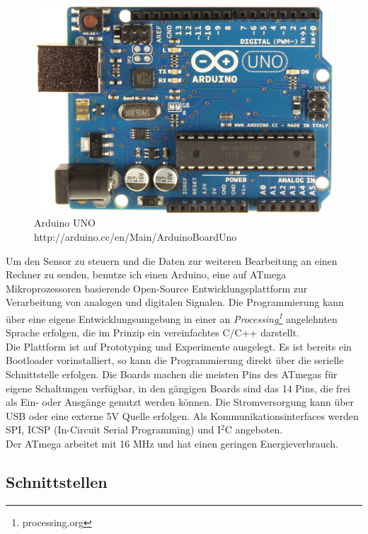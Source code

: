 \documentclass[12pt,a4paper,twoside,BCOR=12.5mm]{scrartcl}
\begin{document}
\begin{figure}[ht]
\centering
\includegraphics[scale=.2]{hardwareimages/ArduinoUno_R3_Front.jpg}
\caption{Arduino UNO \\ http://arduino.cc/en/Main/ArduinoBoardUno}
\label{Arduino}
\end{figure}


Um den Sensor zu steuern und die Daten zur weiteren Bearbeitung an einen Rechner zu senden, benutze ich einen Arduino, eine auf ATmega Mikroprozessoren basierende Open-Source Entwicklungsplattform zur Verarbeitung von analogen und digitalen Signalen. Die Programmierung kann über eine eigene Entwicklungsumgebung in einer an \textit{Processing\footnote{processing.org}} angelehnten Sprache erfolgen, die im Prinzip ein vereinfachtes C/C++ darstellt.\\
Die Plattform ist auf Prototyping und Experimente ausgelegt. Es ist bereits ein Bootloader vorinstalliert, so kann die Programmierung direkt über die serielle Schnittstelle erfolgen. Die Boards machen die meisten Pins des ATmegas für eigene Schaltungen verfügbar, in den gängigen Boards sind das 14 Pins, die frei als Ein- oder Ausgänge genutzt werden können.
Die Stromversorgung kann über USB oder eine externe 5V Quelle erfolgen. Als Kommunikationsinterfaces werden SPI, ICSP (In-Circuit Serial Programming) und I$^2$C angeboten.\\
Der ATmega arbeitet mit 16 MHz und hat einen geringen Energieverbrauch.


\subsection{Schnittstellen}
\end{document}
